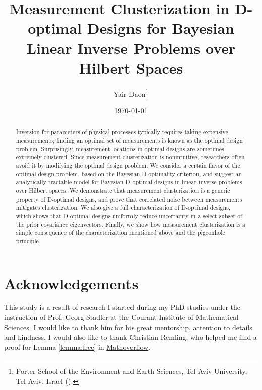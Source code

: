 \documentclass{siamonline220329}
\title{Measurement Clusterization in D-optimal Designs for Bayesian Linear
  Inverse Problems over Hilbert Spaces}
\author{Yair Daon\thanks{Porter School of the Environment and Earth
    Sciences, Tel Aviv University, Tel Aviv, Israel
    (\email{yair.daon@gmail.com}).}}
\date{\today}
\begin{document}
\maketitle
\begin{abstract}
  Inversion for parameters of physical processes typically requires
  taking expensive measurements; finding an optimal set of
  measurements is known as the optimal design problem. Surprisingly,
  measurement locations in optimal designs are sometimes extremely
  clustered. Since measurement clusterization is nonintuitive,
  researchers often avoid it by modifying the optimal design
  problem. We consider a certain flavor of the optimal design problem,
  based on the Bayesian D-optimality criterion, and suggest an
  analytically tractable model for Bayesian D-optimal designs in
  linear inverse problems over Hilbert spaces. We demonstrate that
  measurement clusterization is a generic property of D-optimal
  designs, and prove that correlated noise between measurements
  mitigates clusterization. We also give a full characterization of
  D-optimal designs, which shows that D-optimal designs uniformly
  reduce uncertainty in a select subset of the prior covariance
  eigenvectors. Finally, we show how measurement clusterization is a
  simple consequence of the characterization mentioned above and the
  pigeonhole principle.
\end{abstract}




\maketitle










\section{Acknowledgements}
This study is a result of research I started during my PhD studies
under the instruction of Prof. Georg Stadler at the Courant Institute
of Mathematical Sciences. I would like to thank him for his great
mentorship, attention to details and kindness. I would also like to
thank Christian Remling, who helped me find a proof for Lemma
\ref{lemma:free} in
\href{https://mathoverflow.net/questions/280168/redistribute-diagonal-entries-of-a-matrix/280203#280203c}{Mathoverflow}.
\end{document}
